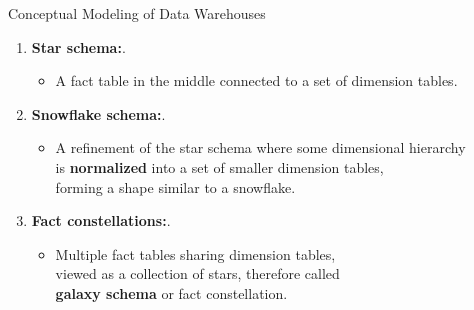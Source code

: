 \begin{frame}{Conceptual Modeling of Data Warehouses}
	\begin{enumerate}
		\item \textbf{Star schema:}.
		      \begin{itemize}
			      \item A fact table in the middle connected to a set of dimension tables.
		      \end{itemize}
		\item \textbf{Snowflake schema:}.
		      \begin{itemize}
			      \item A refinement of the star schema where some dimensional hierarchy \\
			            is \textbf{normalized} into a set of smaller dimension tables,\\
			            forming a shape similar to a snowflake.
		      \end{itemize}
		\item \textbf{Fact constellations:}.
		      \begin{itemize}
			      \item Multiple fact tables sharing dimension tables, \\
			            viewed as a collection of stars, therefore called \\
			            \textbf{galaxy schema} or fact constellation.
		      \end{itemize}
	\end{enumerate}
\end{frame}

